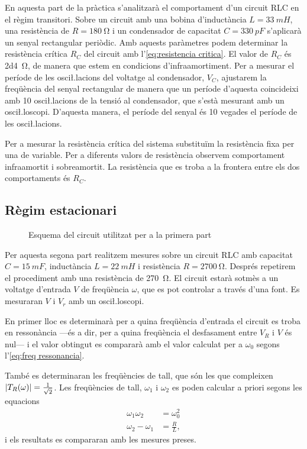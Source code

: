 En aquesta part de la pràctica s'analitzarà el comportament d'un circuit RLC en el règim transitori. Sobre un circuit amb una bobina d'inductància \( L = \SI{33}{mH} \), una resistència de \( R = \SI{180}{\ohm} \) i un condensador de capacitat \( C  = \SI{330}{pF} \) s'aplicarà un senyal rectangular periòdic. Amb aquests paràmetres podem determinar la resistència crítica \( R_C \) del circuit amb l'\cref{eq:resistencia critica}. El valor de \( R_C \) és \SI{2d4}{\ohm}, de manera que estem en condicions d'infraamortiment. Per a mesurar el període de les osci\l.lacions del voltatge al condensador, \( V_C \), ajustarem la freqüència del senyal rectangular de manera que un període d'aquesta coincideixi amb 10 osci\l.lacions de la tensió al condensador, que s'està mesurant amb un osci\l.loscopi. D'aquesta manera, el període del senyal és 10 vegades el període de les osci\l.lacions.

Per a mesurar la resistència crítica del sistema substituïm la resistència fixa per una de variable. Per a diferents valors de resistència observem comportament infraamortit i sobreamortit. La resistència que es troba a la frontera entre els dos comportaments és \( R_C \).  

\subsection{Règim estacionari}
\begin{figure}[htb]
	\centering \small \sffamily
	
	\caption{Esquema del circuit utilitzat per a la primera part}
	\label{fig:esquema estacionari}
\end{figure}

Per aquesta segona part realitzem mesures sobre un circuit RLC amb capacitat \( C = \SI{15}{mF} \), inductància \( L = \SI{22}{mH} \) i resistència \( R = \SI{2700}{\ohm} \). Després repetirem el procediment amb una resistència de \SI{270}{\ohm}. El circuit estarà sotmès a un voltatge d'entrada \( V \) de freqüència \( \omega \), que es pot controlar a través d'una font. Es mesuraran \( V \) i \( V_r \) amb un osci\l.loscopi.  

En primer lloc es determinarà per a quina freqüència d'entrada el circuit es troba en ressonància ---és a dir, per a quina freqüència el desfasament entre \( V_R \) i \( V \) és nul--- i el valor obtingut es compararà amb el valor calculat per a \( \omega_0 \) segons l'\cref{eq:freq ressonancia}. 

També es determinaran les freqüències de tall, que són les que compleixen \( \left\lvert T_R(\omega) \right\rvert = \frac{1}{\sqrt{2}} \). Les freqüències de tall, \( \omega_1 \) i \( \omega_2 \) es poden calcular a priori segons les equacions
\begin{equation} \label{eq:freqs de tall}
	\begin{aligned}
		\omega_1\omega_2 &= \omega_0^2 \\
		\omega_2 - \omega_1 &= \frac{R}{L},
	\end{aligned}
\end{equation}
i els resultats es compararan amb les mesures preses. 

